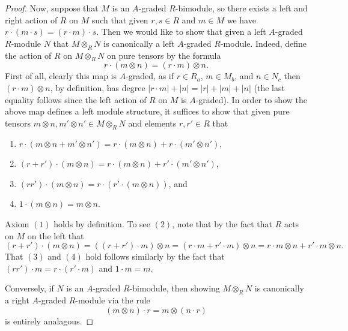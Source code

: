 \documentclass[../main.tex]{subfiles}
\begin{document}
\begin{proof}
	Now, suppose that $M$ is an $A$-graded $R$-bimodule, so there exists a left and right action of $R$ on $M$ such that given $r,s\in R$ and $m\in M$ we have $r\cdot(m\cdot s)=(r\cdot m)\cdot s$. Then we would like to show that given a left $A$-graded $R$-module $N$ that $M\otimes_RN$ is canonically a left $A$-graded $R$-module. Indeed, define the action of $R$ on $M\otimes_RN$ on pure tensors by the formula
	\[r\cdot(m\otimes n)=(r\cdot m)\otimes n.\]
	First of all, clearly this map is $A$-graded, as if $r\in R_a$, $m\in M_b$, and $n\in N_c$ then $(r\cdot m)\otimes n$, by definition, has degree $|r\cdot m|+|n|=|r|+|m|+|n|$ (the last equality follows since the left action of $R$ on $M$ is $A$-graded). In order to show the above map defines a left module structure, it suffices to show that given pure tensors $m\otimes n,m'\otimes n'\in M\otimes_RN$ and elements $r,r'\in R$ that
	\begin{enumerate}
		\item $r\cdot(m\otimes n+m'\otimes n')=r\cdot(m\otimes n)+r\cdot( m'\otimes n')$,
		\item $(r+r')\cdot(m\otimes n)=r\cdot(m\otimes n)+r'\cdot(m'\otimes n')$,
		\item $(rr')\cdot(m\otimes n)=r\cdot(r'\cdot(m\otimes n))$, and
		\item $1\cdot (m\otimes n)=m\otimes n$.
	\end{enumerate}
	Axiom $(1)$ holds by definition. To see $(2)$, note that by the fact that $R$ acts on $M$ on the left that
	\[(r+r')\cdot(m\otimes n)=((r+r')\cdot m)\otimes n=(r\cdot m+r'\cdot m)\otimes n=r\cdot m\otimes n+r'\cdot m\otimes n.\]
	That $(3)$ and $(4)$ hold follows similarly by the fact that $(rr')\cdot m=r\cdot(r'\cdot m)$ and $1\cdot m=m$.

	Conversely, if $N$ is an $A$-graded $R$-bimodule, then showing $M\otimes_RN$ is canonically a right $A$-graded $R$-module via the rule
	\[(m\otimes n)\cdot r=m\otimes(n\cdot r)\]
	is entirely analagous.
\end{proof}
\end{document}
